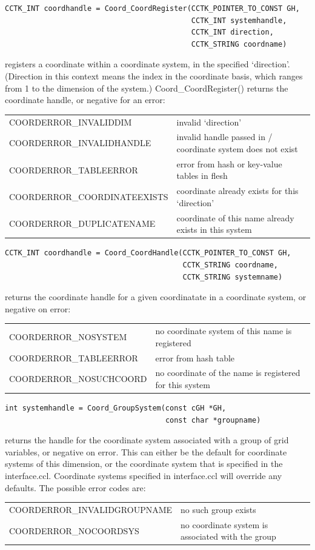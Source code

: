 \begin{verbatim}
CCTK_INT coordhandle = Coord_CoordRegister(CCTK_POINTER_TO_CONST GH, 
                                           CCTK_INT systemhandle, 
                                           CCTK_INT direction,
                                           CCTK_STRING coordname)
\end{verbatim}
registers a coordinate within a coordinate system, in the specified
`direction'.  (Direction in this context means the index in the
coordinate basis, which ranges from 1 to the dimension of the system.)
Coord\_CoordRegister() returns the coordinate handle, or negative for an 
error:\beforetable
\begin{tabular}{ll}
COORDERROR\_INVALIDDIM       & invalid `direction'\\
COORDERROR\_INVALIDHANDLE    & invalid handle passed in / coordinate system
                               does not exist\\
COORDERROR\_TABLEERROR       & error from hash or key-value tables in flesh\\
COORDERROR\_COORDINATEEXISTS & coordinate already exists for this `direction'\\
COORDERROR\_DUPLICATENAME    & coordinate of this name already exists in this
                               system\\
\end{tabular}

\begin{verbatim}
CCTK_INT coordhandle = Coord_CoordHandle(CCTK_POINTER_TO_CONST GH,
                                         CCTK_STRING coordname,
                                         CCTK_STRING systemname)
\end{verbatim}
returns the coordinate handle for a given coordinatate in a coordinate system,
or negative on error:\beforetable
\begin{tabular}{ll}
COORDERROR\_NOSYSTEM    & no coordinate system of this name is registered\\
COORDERROR\_TABLEERROR  & error from hash table\\
COORDERROR\_NOSUCHCOORD & no coordinate of the name is registered for this 
                         system\\
\end{tabular}

\begin{verbatim}
int systemhandle = Coord_GroupSystem(const cGH *GH, 
                                     const char *groupname)
\end{verbatim}
returns the handle for the coordinate system associated with a group of grid 
variables, or negative on error.
This can either be the default for coordinate systems of this
dimension, or the coordinate system that is specified in the
interface.ccl.  Coordinate systems specified in interface.ccl will
override any defaults.  The possible error codes are:\beforetable
\begin{tabular}{ll}
COORDERROR\_INVALIDGROUPNAME & no such group exists\\
COORDERROR\_NOCOORDSYS       & no coordinate system is associated with the
                               group
\end{tabular}

